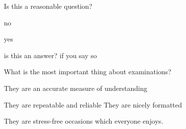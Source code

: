 \documentclass[draft]{exam-n}
\begin{document}
\begin{mcq}
Is this a reasonable question?
\item no
\item yes
\item is this an answer?
\answer if you say so
\end{mcq}

\begin{mcq}
What is the most important thing about examinations?
\item They are an accurate measure of understanding
\item They are repeatable and reliable
\answer They are nicely formatted
\item They are stress-free occasions which everyone enjoys.
\end{mcq}
\end{document}
